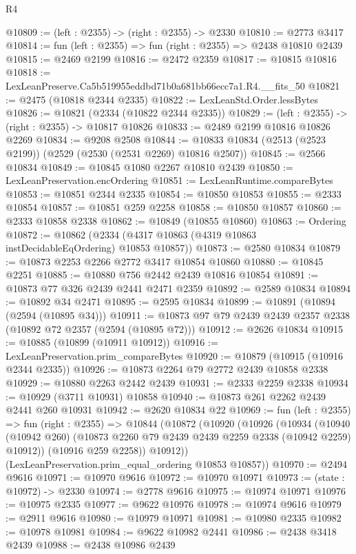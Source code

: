 \begin{lexlean}{R4}
\begin{coremodule}
@10809 := (left : @2355) -> (right : @2355) -> @2330
@10810 := @2773 @3417
@10814 := fun (left : @2355) => fun (right : @2355) => @2438 @10810 @2439
@10815 := @2469 @2199
@10816 := @2472 @2359
@10817 := @10815 @10816
@10818 := LexLeanPreserve.Ca5b519955eddbd71b0a681bb66ecc7a1.R4.__fits_50
@10821 := @2475 (@10818 @2344 @2335)
@10822 := LexLeanStd.Order.lessBytes
@10826 := @10821 (@2334 (@10822 @2344 @2335))
@10829 := (left : @2355) -> (right : @2355) -> @10817 @10826
@10833 := @2489 @2199 @10816 @10826 @2269
@10834 := @9208 @2508
@10844 := @10833 @10834 (@2513 (@2523 @2199)) (@2529 (@2530 (@2531 @2269) @10816 @2507))
@10845 := @2566 @10834
@10849 := @10845 @1080 @2267 @10810 @2439
@10850 := LexLeanPreservation.encOrdering
@10851 := LexLeanRuntime.compareBytes
@10853 := @10851 @2344 @2335
@10854 := @10850 @10853
@10855 := @2333 @10854
@10857 := @10851 @259 @2258
@10858 := @10850 @10857
@10860 := @2333 @10858 @2338
@10862 := @10849 (@10855 @10860)
@10863 := Ordering
@10872 := @10862 (@2334 (@4317 @10863 (@4319 @10863 instDecidableEqOrdering) @10853 @10857))
@10873 := @2580 @10834
@10879 := @10873 @2253 @2266 @2772 @3417 @10854 @10860
@10880 := @10845 @2251
@10885 := @10880 @756 @2442 @2439 @10816 @10854
@10891 := @10873 @77 @326 @2439 @2441 @2471 @2359
@10892 := @2589 @10834
@10894 := @10892 @34 @2471
@10895 := @2595 @10834
@10899 := @10891 (@10894 (@2594 (@10895 @34)))
@10911 := @10873 @97 @79 @2439 @2439 @2357 @2338 (@10892 @72 @2357 (@2594 (@10895 @72)))
@10912 := @2626 @10834
@10915 := @10885 (@10899 (@10911 @10912))
@10916 := LexLeanPreservation.prim_compareBytes
@10920 := @10879 (@10915 (@10916 @2344 @2335))
@10926 := @10873 @2264 @79 @2772 @2439 @10858 @2338
@10929 := @10880 @2263 @2442 @2439
@10931 := @2333 @2259 @2338
@10934 := @10929 (@3711 @10931) @10858
@10940 := @10873 @261 @2262 @2439 @2441 @260 @10931
@10942 := @2620 @10834 @22
@10969 := fun (left : @2355) =>
  fun (right : @2355) =>
  @10844
    (@10872
      (@10920
        (@10926
          (@10934
            (@10940 (@10942 @260) (@10873 @2260 @79 @2439 @2439 @2259 @2338 (@10942 @2259) @10912))
            (@10916 @259 @2258))
          @10912))
      (LexLeanPreservation.prim_equal_ordering @10853 @10857))
@10970 := @2494 @9616
@10971 := @10970 @9616
@10972 := @10970 @10971
@10973 := (state : @10972) -> @2330
@10974 := @2778 @9616
@10975 := @10974 @10971
@10976 := @10975 @2335
@10977 := @9622 @10976
@10978 := @10974 @9616
@10979 := @2911 @9616
@10980 := @10979 @10971
@10981 := @10980 @2335
@10982 := @10978 @10981
@10984 := @9622 @10982 @2441
@10986 := @2438 @3418 @2439
@10988 := @2438 @10986 @2439

\end{coremodule}
\end{lexlean}

